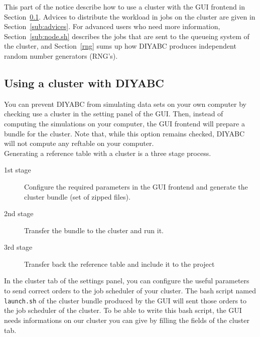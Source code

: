 This part of the notice describe how to use a cluster with the GUI frontend in Section~\ref{sub:proceed}. Advices to distribute the workload in jobs on the cluster are given in Section~\ref{sub:advices}. For advanced users who need more information, Section~\ref{sub:node.sh} describes the jobs that are sent to the queueing system of the cluster, and Section~\ref{rng} sums up how DIYABC produces independent random number generators (RNG's).

\subsection{Using a cluster with DIYABC}\label{sub:proceed}
You can prevent DIYABC from simulating data sets on your own computer by checking \textsf{use a cluster} in the setting panel of the GUI. Then, instead of computing the simulations on your computer, the GUI frontend will prepare a bundle for the cluster. Note that, while this option remains checked, DIYABC will not compute any reftable on your computer. 
\\
Generating a reference table with a cluster is a three stage process.
\begin{description}%
 \item[1st stage] Configure the required parameters in the GUI frontend and generate the cluster bundle (set of zipped files).
 \item[2nd stage] Transfer the bundle to the cluster and run it.
 \item[3rd stage] Transfer back the reference table and include it to the project
\end{description}

In the cluster tab of the settings panel, you can configure the useful parameters to send correct orders to the job scheduler of your cluster. The bash script named \texttt{launch.sh} of the cluster bundle produced by the GUI will sent those orders to the job scheduler of the cluster. To be able to write this bash script, the GUI needs informations on our cluster you can give by filling the fields of the cluster tab. \\

